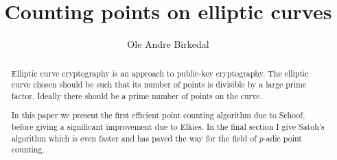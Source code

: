 \documentclass[a4paper,11pt,latin1]{amsart}
\title{Counting points on elliptic curves}
\author{Ole Andre Birkedal}
\begin{document}
\newtheorem{thm}{Theorem}
\newtheorem{mydef}{Definition}
\newtheorem{ex}{Example}
\newtheorem{prop}{Proposition}
\newtheorem{lemma}{Lemma}
\newtheorem{cor}{Corollary}

\begin{abstract}
Elliptic curve cryptography is an approach to public-key cryptography.
The elliptic curve chosen should be such that its number of points is divisible by
a large prime factor. Ideally there should be a prime number of points on the curve.

In this paper we present the first efficient point counting algorithm due to Schoof,
before giving a significant improvement due to Elkies. In the final section I give Satoh's
algorithm which is even faster and has paved the way for the field of $p$-adic point counting.
\end{abstract}

\maketitle

\tableofcontents











\nocite{*}
\end{document}
